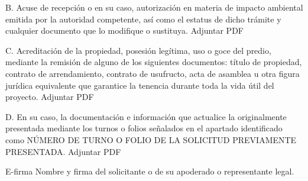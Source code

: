  B. Acuse de recepción o en su caso, autorización en materia de impacto ambiental emitida por la autoridad competente, así como el estatus de dicho trámite y cualquier documento que lo modifique o sustituya.
 Adjuntar PDF
 
 C. Acreditación de la propiedad, posesión legítima, uso o goce del predio, mediante la remisión de alguno de los siguientes documentos: título de propiedad, contrato de arrendamiento, contrato de usufructo, acta de asamblea u otra figura jurídica equivalente que garantice la tenencia durante toda la vida útil del proyecto.
 Adjuntar PDF
 
 D. En su caso, la documentación e información que actualice la originalmente presentada mediante los turnos o folios señalados en el apartado identificado como NÚMERO DE TURNO O FOLIO DE LA SOLICITUD PREVIAMENTE PRESENTADA.
 Adjuntar PDF
 
 E-firma
Nombre y firma del solicitante o de su apoderado o representante legal.
 
